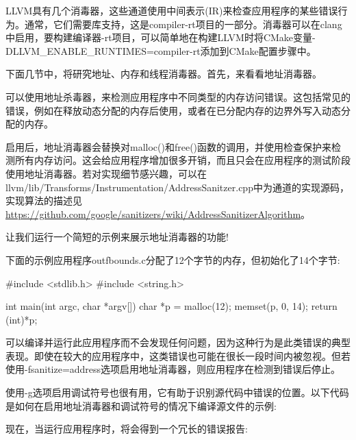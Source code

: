 
LLVM具有几个消毒器，这些通道使用中间表示(IR)来检查应用程序的某些错误行为。通常，它们需要库支持，这是compiler-rt项目的一部分。消毒器可以在clang中启用，要构建编译器-rt项目，可以简单地在构建LLVM时将CMake变量-DLLVM\_ENABLE\_RUNTIMES=compiler-rt添加到CMake配置步骤中。

下面几节中，将研究地址、内存和线程消毒器。首先，来看看地址消毒器。


可以使用地址杀毒器，来检测应用程序中不同类型的内存访问错误。这包括常见的错误，例如在释放动态分配的内存后使用，或者在已分配内存的边界外写入动态分配的内存。

启用后，地址消毒器会替换对malloc()和free()函数的调用，并使用检查保护来检测所有内存访问。这会给应用程序增加很多开销，而且只会在应用程序的测试阶段使用地址消毒器。若对实现细节感兴趣，可以在llvm/lib/Transforms/Instrumentation/AddressSanitzer.cpp中为通道的实现源码，实现算法的描述见\url{https://github.com/google/sanitizers/wiki/AddressSanitizerAlgorithm}。

让我们运行一个简短的示例来展示地址消毒器的功能!

下面的示例应用程序outfbounds.c分配了12个字节的内存，但初始化了14个字节:

\begin{cpp}
#include <stdlib.h>
#include <string.h>

int main(int argc, char *argv[]) {
    char *p = malloc(12);
    memset(p, 0, 14);
    return (int)*p;
}
\end{cpp}

可以编译并运行此应用程序而不会发现任何问题，因为这种行为是此类错误的典型表现。即使在较大的应用程序中，这类错误也可能在很长一段时间内被忽视。但若使用-fsanitize=address选项启用地址消毒器，则应用程序在检测到错误后停止。

使用-g选项启用调试符号也很有用，它有助于识别源代码中错误的位置。以下代码是如何在启用地址消毒器和调试符号的情况下编译源文件的示例:


现在，当运行应用程序时，将会得到一个冗长的错误报告:


